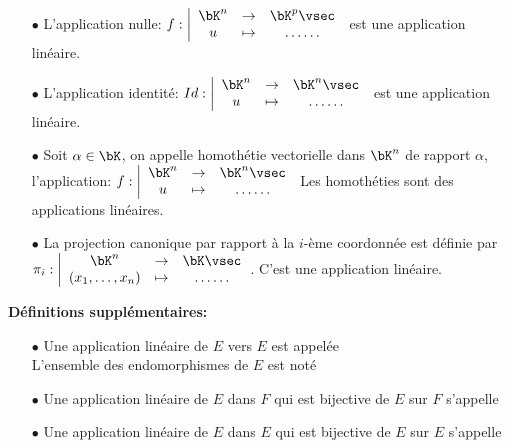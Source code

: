 \documentclass[a4paper, 11pt]{article}
\begin{document}
\begin{exemples} 
\begin{itemize}
\item[$\bullet$] L'application nulle: $f: \left|\begin{array}{ccc} \bK^n &\rightarrow & \bK^p\vsec\\ u & \mapsto & \ldots \ldots \end{array} \right.$
est une application lin\'eaire.
\item[$\bullet$] L'application identit\'e: $Id: \left|\begin{array}{ccc} \bK^n &\rightarrow & \bK^n\vsec\\ u & \mapsto & \ldots \ldots \end{array} \right.$
est une application lin\'eaire.
\item[$\bullet$] Soit $\alpha\in\bK$, on appelle homoth\'etie vectorielle dans $\bK^n$ de rapport $\alpha$, l'application: $f : \left|\begin{array}{ccc} \bK^n &\rightarrow & \bK^n \vsec\\ u & \mapsto & \ldots \ldots \end{array} \right.$
Les homoth\'eties sont des applications lin\'eaires. 




\item[$\bullet$] La projection canonique par rapport \`a la $i$-\`eme coordonn\'ee est d\'efinie par $\pi_i : \left|\begin{array}{ccc} \bK^n &\rightarrow & \bK \vsec\\ (x_1, \ldots, x_n) & \mapsto & \ldots \ldots \end{array} \right.$. C'est une application lin\'eaire.

\end{itemize}
\end{exemples}



\vsec

\begin{defi} \textbf{D\'efinitions suppl\'ementaires:}\vsec
\begin{itemize}
\item[$\bullet$] Une application lin\'eaire de $E$ vers $E$ est appel\'ee \dotfill\vsec\\
L'ensemble des endomorphismes de $E$ est not\'e \dotfill\vsec
\item[$\bullet$]  Une application lin\'eaire de $E$ dans $F$ qui est bijective de $E$ sur $F$ s'appelle\\ \phantom{}\dotfill \vsec
\item[$\bullet$]  Une application lin\'eaire de $E$ dans $E$ qui est bijective de $E$ sur $E$ s'appelle \\\phantom{} \dotfill \vsec
\end{itemize}
\end{defi}
 
\end{document}
